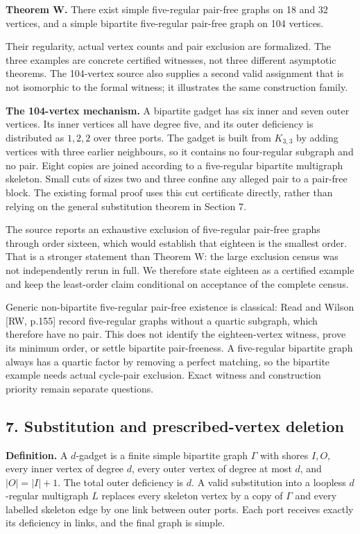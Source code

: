 \documentclass[
  11pt,
]{article}
\begin{document}
\textbf{Theorem W.} There exist simple five-regular pair-free graphs on
18 and 32 vertices, and a simple bipartite five-regular pair-free graph
on 104 vertices.

Their regularity, actual vertex counts and pair exclusion are
formalized. The three examples are concrete certified witnesses, not
three different asymptotic theorems. The 104-vertex source also supplies
a second valid assignment that is not isomorphic to the formal witness;
it illustrates the same construction family.

\textbf{The 104-vertex mechanism.} A bipartite gadget has six inner and
seven outer vertices. Its inner vertices all have degree five, and its
outer deficiency is distributed as \(1,2,2\) over three ports. The
gadget is built from \(K_{3,3}\) by adding vertices with three earlier
neighbours, so it contains no four-regular subgraph and no pair. Eight
copies are joined according to a five-regular bipartite multigraph
skeleton. Small cuts of sizes two and three confine any alleged pair to
a pair-free block. The existing formal proof uses this cut certificate
directly, rather than relying on the general substitution theorem in
Section 7.

The source reports an exhaustive exclusion of five-regular pair-free
graphs through order sixteen, which would establish that eighteen is the
smallest order. That is a stronger statement than Theorem W: the large
exclusion census was not independently rerun in full. We therefore state
eighteen as a certified example and keep the least-order claim
conditional on acceptance of the complete census.

Generic non-bipartite five-regular pair-free existence is classical:
Read and Wilson {[}RW, p.155{]} record five-regular graphs without a
quartic subgraph, which therefore have no pair. This does not identify
the eighteen-vertex witness, prove its minimum order, or settle
bipartite pair-freeness. A five-regular bipartite graph always has a
quartic factor by removing a perfect matching, so the bipartite example
needs actual cycle-pair exclusion. Exact witness and construction
priority remain separate questions.

\subsection{7. Substitution and prescribed-vertex
deletion}\label{substitution-and-prescribed-vertex-deletion}

\textbf{Definition.} A \(d\)-gadget is a finite simple bipartite graph
\(\Gamma\) with shores \(I,O\), every inner vertex of degree \(d\),
every outer vertex of degree at most \(d\), and \(|O|=|I|+1\). The total
outer deficiency is \(d\). A valid substitution into a loopless
\(d\)-regular multigraph \(L\) replaces every skeleton vertex by a copy
of \(\Gamma\) and every labelled skeleton edge by one link between outer
ports. Each port receives exactly its deficiency in links, and the final
graph is simple.
\end{document}
